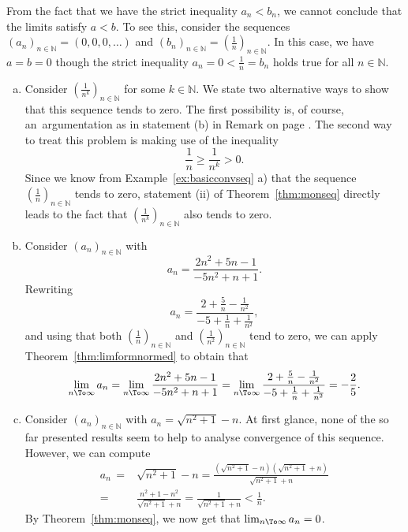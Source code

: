 \begin{Attention}{}
  From the fact that we have the strict inequality $a_n<b_n$, we cannot conclude that the limits satisfy $a<b$. To see this, consider the sequences\linebreak $(a_n)_{n\in\mathbb{N}}=(0,0,0,\ldots)$ and
  $(b_n)_{n\in\mathbb{N}}=(\frac1n)_{n\in\mathbb{N}}$. In this case, we have $a=b=0$ though the strict inequality $a_n=0<\frac1n=b_n$ holds true for all $n\in\mathbb{N}$.
\end{Attention}

\begin{example}
\begin{enumerate}[a)]
  \item Consider $(\frac1{n^k})_{n\in\mathbb{N}}$ for some $k\in\mathbb{N}$. We state two alternative ways to show that this sequence tends to zero.
The first possibility is, of course, an~argumentation as in statement (b) in Remark on page \pageref{rem:seqpot}. The second way to treat this problem is making use of the inequality
\[\frac1n\geq\frac1{n^k}>0.\]
    Since we know from Example~\ref{ex:basicconvseq} a) that the sequence $(\frac1n)_{n\in\mathbb{N}}$ tends to zero, statement (ii) of Theorem~\ref{thm:monseq} directly leads to the fact that
    $(\frac1{n^k})_{n\in\mathbb{N}}$ also tends to zero.
  \item Consider $(a_n)_{n\in\mathbb{N}}$ with
\[a_n=\frac{2n^2+5n-1}{-5n^2+n+1}.\]
Rewriting
\[a_n=\frac{2+\frac5n-\frac1{n^2}}{-5+\frac1n+\frac1{n^2}},\]
    and using that both $(\frac1{n})_{n\in\mathbb{N}}$ and $(\frac1{n^2})_{n\in\mathbb{N}}$ tend to zero, we can apply Theorem~\ref{thm:limformnormed} to obtain that
\[\lim_{n\To\infty}a_n=\lim_{n\To\infty}\frac{2n^2+5n-1}{-5n^2+n+1}=\lim_{n\To\infty}\frac{2+\frac5n-\frac1{n^2}}{-5+\frac1n+\frac1{n^2}}=-\frac25.\]
\item Consider $(a_n)_{n\in\mathbb{N}}$ with $a_n=\sqrt{n^2+1}-n$. At first glance, none of the so far presented results seem to help to analyse convergence of this sequence. However, we can compute
\[
\begin{aligned}
a_n\,=&\sqrt{n^2+1}-n
=\frac{(\sqrt{n^2+1}-n)(\sqrt{n^2+1}+n)}{\sqrt{n^2+1}+n}\\
=&\frac{n^2+1-n^2}{\sqrt{n^2+1}+n}
=\frac{1}{\sqrt{n^2+1}+n}<\frac1n.
\end{aligned}
\]
By Theorem~\ref{thm:monseq}, we now get that $\lim_{n\To\infty}a_n=0$.
\end{enumerate}
\end{example}
